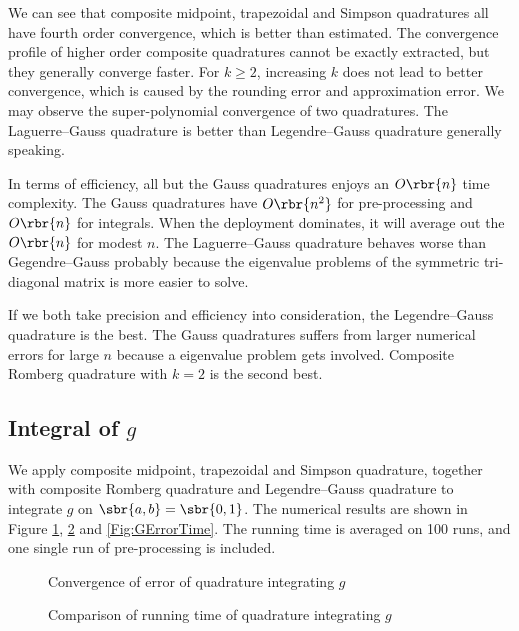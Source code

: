 \documentclass[english, nochinese]{pnote}
\begin{document}
We can see that composite midpoint, trapezoidal and Simpson quadratures all have fourth order convergence, which is better than estimated. The convergence profile of higher order composite quadratures cannot be exactly extracted, but they generally converge faster. For $ k \ge 2 $, increasing $k$ does not lead to better convergence, which is caused by the rounding error and approximation error. We may observe the super-polynomial convergence of two quadratures. The Laguerre--Gauss quadrature is better than Legendre--Gauss quadrature generally speaking.

In terms of efficiency, all but the Gauss quadratures enjoys an $ O \rbr{n} $ time complexity. The Gauss quadratures have $ O \rbr{n^2} $ for pre-processing and $ O \rbr{n} $ for integrals. When the deployment dominates, it will average out the $ O \rbr{n} $ for modest $n$. The Laguerre--Gauss quadrature behaves worse than Gegendre--Gauss probably because the eigenvalue problems of the symmetric tri-diagonal matrix is more easier to solve.

If we both take precision and efficiency into consideration, the Legendre--Gauss quadrature is the best. The Gauss quadratures suffers from larger numerical errors for large $n$ because a eigenvalue problem gets involved. Composite Romberg quadrature with $ k = 2 $ is the second best.

\subsection{Integral of $g$}

We apply composite midpoint, trapezoidal and Simpson quadrature, together with composite Romberg quadrature and Legendre--Gauss quadrature to integrate $g$ on $ \sbr{ a, b } = \sbr{ 0, 1 } $. The numerical results are shown in Figure \ref{Fig:GError}, \ref{Fig:GTime} and \ref{Fig:GErrorTime}. The running time is averaged on 100 runs, and one single run of pre-processing is included.

\begin{figure}
\centering
\scalebox{0.70}{}
\caption{Convergence of error of quadrature integrating $g$}
\label{Fig:GError}
\end{figure}

\begin{figure}
\centering
\scalebox{0.70}{}
\caption{Comparison of running time of quadrature integrating $g$}
\label{Fig:GTime}
\end{figure}
\end{document}
